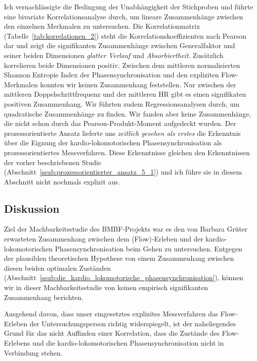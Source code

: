 Ich vernachlässigte die Bedingung der Unabhängigkeit der Stichproben und führte eine bivariate Korrelationsanalyse durch, um lineare Zusammenhänge zwischen den einzelnen Merkmalen zu untersuchen. Die Korrelationmatrix (Tabelle~\ref{tab:korrelationen_2}) steht die Korrelationskoeffizienten nach Pearson dar und zeigt die signifikanten Zusammenhänge zwischen Generalfaktor und seiner beiden Dimensionen \emph{glatter Verlauf} und \emph{Absorbiertheit}. Zusätzlich korrelieren beide Dimensionen positiv. Zwischen dem mittleren normalisierten Shannon Entropie Index der Phasensynchronisation und den expliziten Flow-Merkmalen konnten wir keinen Zusammenhang feststellen. Nur zwischen der mittleren Doppelschrittfrequenz und der mittleren \ac{HR} gibt es einen signifikaten positiven Zusammenhang. Wir führten zudem Regressionsanalysen durch, um quadratische Zusammenhänge zu finden. Wir fanden aber keine Zusammenhänge, die nicht schon durch das Pearson-Produkt-Moment aufgedeckt wurden. Der prozessorientierte Ansatz lieferte uns \emph{zeitlich gesehen als erstes} die Erkenntnis über die Eignung der kardio-lokomotorischen Phasensynchronisation als prozessorientiertes Messverfahren. Diese Erkenntnisse gleichen den Erkenntnissen der vorher beschriebenen Studie (Abschnitt~\ref{ssub:prozessorientierter_ansatz_5_1}) und ich führe sie in diesem Abschnitt nicht nochmals explizit aus.

\subsection{Diskussion} 

\label{sub:diskussion_5_2}

Ziel der Machbarkeitsstudie des \acs{BMBF}-Projekts war es den von Barbara Grüter erwarteten Zusammenhang zwischen dem (Flow)-Erleben und der kardio-lokomotorischen Phasensynchronisation beim Gehen zu untersuchen. Entgegen der plausiblen theoretischen Hypothese von einem Zusammenhang zwischen diesen beiden optimalen Zuständen (Abschnitt~\ref{ssub:die_kardio_lokomotorische_phasensynchronisation}), können wir in dieser Machbarkeitsstudie von keinen empirisch signifikanten Zusammenhang berichten.

Ausgehend davon, dass unser eingesetztes explizites Messverfahren das Flow-Erleben der Untersuchungsperson richtig widerspiegelt, ist der naheliegendes Grund für das nicht Auffinden einer Korrelation, dass die Zustände des Flow-Erlebens und die kardio-lokomotorischen Phasensynchronisation nicht in Verbindung stehen.

